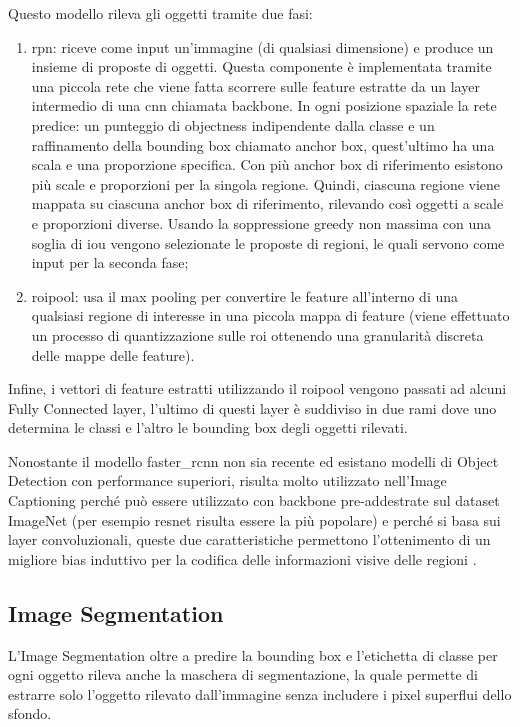 Questo modello rileva gli oggetti tramite due fasi:
\begin{enumerate}
    \item \acrfull{rpn}: riceve come input un'immagine (di qualsiasi dimensione) e produce un insieme di proposte di oggetti. Questa componente è implementata tramite una piccola rete che viene fatta scorrere sulle feature estratte da un layer intermedio di una \acrshort{cnn} chiamata backbone. In ogni posizione spaziale la rete predice: un punteggio di objectness indipendente dalla classe e un raffinamento della bounding box chiamato anchor box, quest'ultimo ha una scala e una proporzione specifica. Con più anchor box di riferimento esistono più scale e proporzioni per la singola regione. Quindi, ciascuna regione viene mappata su ciascuna anchor box di riferimento, rilevando così oggetti a scale e proporzioni diverse. Usando la soppressione greedy non massima con una soglia di \acrfull{iou} vengono selezionate le proposte di regioni, le quali servono come input per la seconda fase;
    \item \acrfull{roipool}: usa il max pooling per convertire le feature all'interno di una qualsiasi regione di interesse in una piccola mappa di feature (viene effettuato un processo di quantizzazione sulle \acrshort{roi} ottenendo una granularità discreta delle mappe delle feature).
\end{enumerate}
Infine, i vettori di feature estratti utilizzando il \acrlong{roipool} vengono passati ad alcuni Fully Connected layer, l'ultimo di questi layer è suddiviso in due rami dove uno determina le classi e l'altro le bounding box degli oggetti rilevati.


Nonostante il modello \acrshort{faster_rcnn} non sia recente ed esistano modelli di Object Detection con performance superiori, risulta molto utilizzato nell'Image Captioning perché può essere utilizzato con backbone pre-addestrate sul dataset ImageNet (per esempio \acrshort{resnet} risulta essere la più popolare) e perché si basa sui layer convoluzionali, queste due caratteristiche permettono l'ottenimento di un migliore bias induttivo per la codifica delle informazioni visive delle regioni \cite{jiang2020defense}.

\subsection{Image Segmentation}
L'Image Segmentation oltre a predire la bounding box e l'etichetta di classe per ogni oggetto rileva anche la maschera di segmentazione, la quale permette di estrarre solo l'oggetto rilevato dall'immagine senza includere i pixel superflui dello sfondo.

